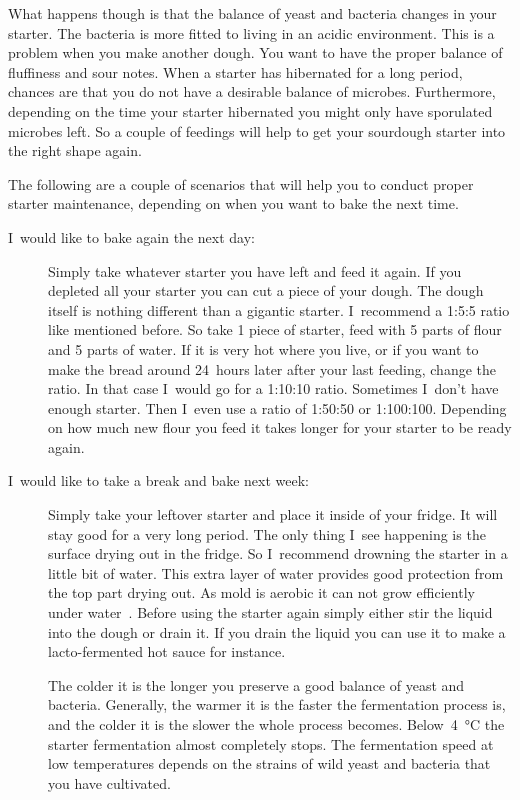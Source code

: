 What happens though is that the balance of yeast and
bacteria changes in your starter. The bacteria is more fitted to living
in an acidic environment. This is a problem when you make another dough.
You want to have the proper balance of fluffiness and sour notes.
When a starter has hibernated for a long period, chances are that
you do not have a desirable balance of microbes.
Furthermore, depending on the time your starter hibernated you might only have
sporulated microbes left. So a couple of feedings will help to get your
sourdough starter into the right shape again.

The following are a couple of scenarios that will help you to conduct proper
starter maintenance, depending on when you want to bake the next time.

\begin{description}
\item[I~would like to bake again the next day:]
Simply take whatever starter you have left and feed it again. If you depleted
all your starter you can cut a piece of your dough. The dough itself is
nothing different than a gigantic starter. I~recommend a 1:5:5 ratio like
mentioned before. So take 1 piece of starter, feed with 5 parts of flour and 5
parts of water. If it is very hot where you live, or if you want to make the
bread around 24~hours later after your last feeding, change the ratio. In that
case I~would go for a 1:10:10 ratio. Sometimes I~don't have enough starter.
Then I~even use a ratio of 1:50:50 or 1:100:100. Depending on how much new
flour you feed it takes longer for your starter to be ready again.

\item[I~would like to take a break and bake next week:]
Simply take your leftover starter and place it inside of your fridge. It will stay good
for a very long period. The only thing I~see happening is the surface
drying out in the fridge. So I~recommend drowning the starter in a little bit
of water. This extra layer of water provides good protection from the top
part drying out. As mold is aerobic it can not grow efficiently under
water~\cite{mold+anaerobic}. Before using the starter again simply either stir
the liquid into the dough or drain it. If you drain the liquid you can use it
to make a lacto-fermented hot sauce for instance.

The colder it is the longer you preserve a good balance of yeast and
bacteria. Generally, the warmer it is the faster the fermentation process is,
and the colder it is the slower the whole process becomes.
Below~\qty{4}{\degreeCelsius} the starter fermentation almost completely stops. The
fermentation speed at low temperatures depends on the
strains of wild yeast and bacteria
that you have cultivated.


\end{description}
